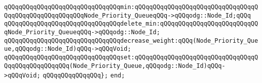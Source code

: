 \verb|qQQqqQQqqQQqqQQqqQQqqQQqqQQqqQQqmin:qQQqqQQqqQQqqQQqqQQqqQQqqQQqqQQqqQQqqQQqqQQqqQQqqQQqqQQqNode_Priority_QueueqQQq->qQQqodg::Node_Id;qQQq|\newline
\verb|qQQqqQQqqQQqqQQqqQQqqQQqqQQqqQQqdelete_min:qQQqqQQqqQQqqQQqqQQqqQQqqQQqNode_Priority_QueueqQQq->qQQqodg::Node_Id;|\newline
\verb|qQQqqQQqqQQqqQQqqQQqqQQqqQQqqQQqdecrease_weight:qQQq(Node_Priority_Queue,qQQqodg::Node_Id)qQQq->qQQqVoid;|\newline
\verb|qQQqqQQqqQQqqQQqqQQqqQQqqQQqqQQqset:qQQqqQQqqQQqqQQqqQQqqQQqqQQqqQQqqQQqqQQqqQQqqQQqqQQq(Node_Priority_Queue,qQQqodg::Node_Id)qQQq->qQQqVoid;|\newline
\verb|qQQqqQQqqQQqqQQq};|\newline
\verb|end;|\newline

